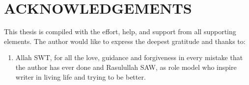 \chapter*{ACKNOWLEDGEMENTS}
This thesis is compiled with the effort, help, and support from all supporting elements. The author would like to express the deepest gratitude and thanks to:
\begin{enumerate}
\item Allah SWT, for all the love, guidance and forgiveness in every mistake that the author has ever done and Rasulullah SAW, as role model who inspire writer in living life and trying to be better.

\end{enumerate}
  

